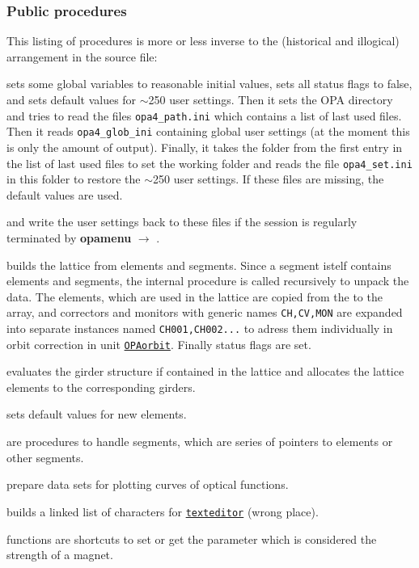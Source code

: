 \documentclass[12pt]{article}
\newcommand\code[1]{{\tt #1}}
\newcommand{\ofld}[1]{\colorbox{black!15}{{\bf #1}}}
\newcommand\guico[1]{{\color{blue}\code{#1}}}
\newcommand{\unico}[1]{{\color{burntorange}\code{#1}}}
\newcommand{\evcod}[2]{\ofld{#1} $\rightarrow$ \guico{#2}}
\newcommand{\opagui}[1]{\colorbox{blue!20}{\code{#1}}}
\newcommand{\ogui}[1]{\hyperref[#1]{\opagui{#1}}}
\newcommand{\ppro}[1]{\subsubsection*{Public procedures} #1}
\newcommand{\todo}[1]{{\color{red} #1}}
\begin{document}
\ppro{
This listing of procedures is more or less inverse to the (historical and illogical) arrangement in the source file:

\unico{Initialization} sets some global variables to reasonable initial values, sets all status flags to false, and sets default values for $\sim$250 user settings.
Then it sets the OPA directory and tries to read the files \code{opa4\_path.ini} which contains a list of last used files. Then it reads \code{opa4\_glob\_ini} containing global user settings (at the moment this is only the amount of output). Finally, it takes the folder from the first entry in the list of last used files to set the working folder and reads the file \code{opa4\_set.ini} in this folder to restore the $\sim$250 user settings. If these files are missing, the default values are used.

\unico{GlobDefWriteFile} and \unico{DefWriteFile} write the user settings back to these files if the session is regularly terminated by \evcod{opamenu}{ExitOPA}.

\unico{MakeLattice} builds the lattice from elements and segments. Since a segment istelf contains elements and segments, the internal procedure \unico{SegLat} is called recursively to unpack the data. 
The elements, which are used in the lattice are copied from the \unico{Elem} to the \unico{Ella} array, and correctors and monitors with generic names \code{CH,CV,MON}
are expanded into separate instances named \code{CH001,CH002...} to adress them individually in orbit correction in unit \ogui{OPAorbit}. Finally status flags are set.

\unico{GirderSetup} evaluates the girder structure if contained in the lattice and allocates the lattice elements to the corresponding girders.

\unico{IniElem} sets default values for new elements.

\unico{AppendAE, ClearSeg, NAESeg} are procedures to handle segments, which are series of pointers to elements or other segments.

\unico{AppendCurve, ClearCurve}  prepare data sets for plotting curves of optical functions. 

\unico{AppendChar} builds a linked list of characters for \ogui{texteditor} \todo{(wrong place)}.

\unico{putkval, getkval, putSexkval, getSexkval} functions are shortcuts to set or get the parameter which is considered the strength of a magnet.

}
\end{document}
